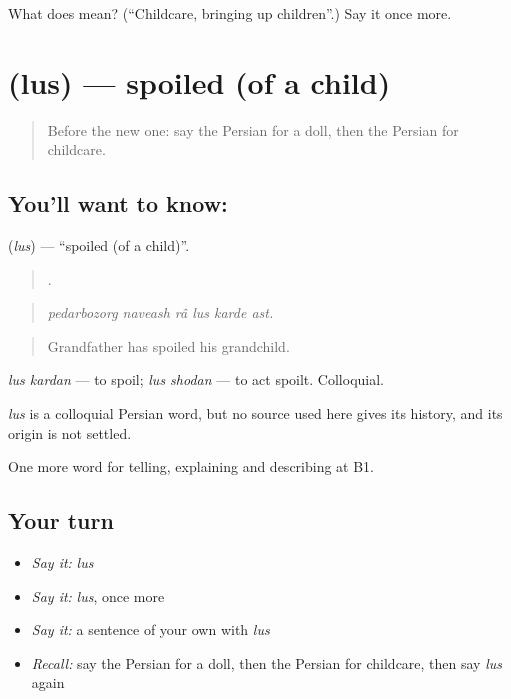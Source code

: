 \begin{tcolorbox}[breakable,colback=teal!4,colframe=teal!35!black,title={Before you move on}]
What does   mean? (\textquotedblleft{}Childcare, bringing up children\textquotedblright{}.) Say it once more.
\end{tcolorbox}
\section[\texorpdfstring{\fa{لوس} (lus)}{لوس (lus)}]{ (lus) — spoiled (of a child)}

\label{lesson:FA-C503-lus}



\begin{quote}
Before the new one: say the Persian for a doll, then the Persian for childcare.
\end{quote}

\subsection*{You'll want to know: }
\textbf{} (\emph{lus}) — \textquotedblleft{}spoiled (of a child)\textquotedblright{}.

\begin{quote}
      .
\end{quote}

\begin{quote}
\emph{pedarbozorg naveash râ lus karde ast.}
\end{quote}

\begin{quote}
Grandfather has spoiled his grandchild.
\end{quote}

\emph{lus kardan} — to spoil; \emph{lus shodan} — to act spoilt. Colloquial.

\begin{cousinweb}
\emph{lus} is a colloquial Persian word, but no source used here gives its history, and its origin is not settled.
\end{cousinweb}

\begin{grammarlens}[title={What you've built}]
One more word for telling, explaining and describing at B1.
\end{grammarlens}

\subsection*{Your turn}
\begin{itemize}
\raggedright
  \item \emph{Say it:} \emph{lus}
  \item \emph{Say it:} \emph{lus}, once more
  \item \emph{Say it:} a sentence of your own with \emph{lus}
  \item \emph{Recall:} say the Persian for a doll, then the Persian for childcare, then say \emph{lus} again
\end{itemize}

